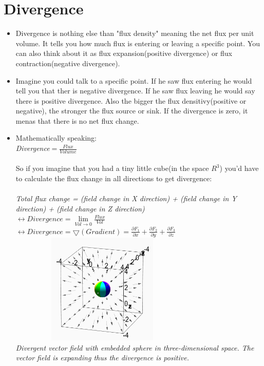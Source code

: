 \documentclass[12pt,a4paper]{article}
\begin{document}
	\newpage
	
	\section{Divergence}
	
		\begin{itemize}
			\item Divergence is nothing else than "flux density" meaning the net flux per unit volume. It tells you how much flux is entering or leaving a specific point. You can also think about it as flux expansion(positive divergence) or flux contraction(negative divergence).
			
			\item Imagine you could talk to a specific point. If he saw flux entering he would tell you that ther is negative divergence. If he saw flux leaving he would say there is positive divergence. Also the bigger the flux densitivy(positive or negative), the stronger the flux source or sink. If the divergence is zero, it menas that there is no net flux change. 
			
			\item Mathematically speaking: \\
			\textit{Divergence}$ = \frac{Flux}{Volume}$ \\ \\ 
			So if you imagine that you had a tiny little cube(in the space $R^3$) you'd have to calculate the flux change in all directions to get divergence: \\ \\
			\textit{Total flux change = (field change in X direction) + (field change in Y direction) + (field change in Z direction)} \\
			$ \leftrightarrow Divergence = \lim\limits_{Vol \rightarrow 0} \frac{Flux}{Vol}$ \\
			$\leftrightarrow Divergence = \bigtriangledown (Gradient) =  \frac{\partial F_1}{\partial x} + \frac{\partial F_2}{\partial y} + \frac{\partial F_3}{\partial z}$\\
			
			\includegraphics[width=0.7\textwidth, height = 200px]{divergence.png}\\
			\textit{Divergent vector field with embedded sphere in three-dimensional space. The vector field is expanding thus the divergence is positive.}
			
		\end{itemize}
	
\end{document}
